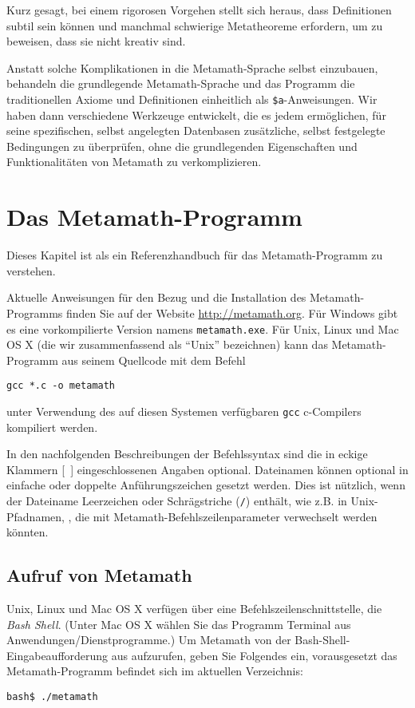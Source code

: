 Kurz gesagt, bei einem rigorosen Vorgehen stellt sich heraus, dass Definitionen subtil sein können und manchmal schwierige Metatheoreme erfordern, um zu beweisen, dass sie nicht kreativ sind.

Anstatt solche Komplikationen in die Metamath-Sprache selbst einzubauen, behandeln die grundlegende Metamath-Sprache und das Programm die traditionellen Axiome und Definitionen einheitlich als \texttt{\$a}-Anweisungen. Wir haben dann verschiedene Werkzeuge entwickelt, die es jedem ermöglichen, für seine spezifischen, selbst angelegten Datenbasen zusätzliche, selbst festgelegte Bedingungen zu überprüfen, ohne die grundlegenden Eigenschaften und Funktionalitäten von Metamath zu verkomplizieren.

\chapter{Das Metamath-Programm}\label{commands}

Dieses Kapitel ist als ein Referenzhandbuch für das Metamath-Programm zu verstehen.

Aktuelle Anweisungen für den Bezug und die Installation des Metamath-Programms finden Sie auf der Website \url{http://metamath.org}. Für Windows gibt es eine vorkompilierte Version namens \texttt{metamath.exe}.  Für Unix, Linux und Mac OS X (die wir zusammenfassend als "`Unix"' bezeichnen) kann das Metamath-Programm aus seinem Quellcode mit dem Befehl
\begin{verbatim}
gcc *.c -o metamath
\end{verbatim}
unter Verwendung des auf diesen Systemen verfügbaren \texttt{gcc} {\sc c}-Compilers kompiliert werden.

In den nachfolgenden Beschreibungen der Befehlssyntax sind die in eckige Klammern [\ ] eingeschlossenen Angaben optional.  Dateinamen können optional in einfache oder doppelte Anführungszeichen gesetzt werden.  Dies ist nützlich, wenn der Dateiname Leerzeichen oder Schrägstriche (\texttt{/}) enthält, wie z.B. in Unix-Pfadnamen, , die mit Metamath-Befehlszeilenparameter verwechselt werden könnten.

\section{Aufruf von Metamath}

Unix, Linux und Mac OS X verfügen über eine Befehlszeilenschnittstelle, die  {\em Bash Shell}.  (Unter Mac OS X wählen Sie das Programm Terminal aus Anwendungen/Dienstprogramme.) Um Metamath von der Bash-Shell-Eingabeaufforderung aus aufzurufen, geben Sie Folgendes ein, vorausgesetzt das Metamath-Programm befindet sich im aktuellen Verzeichnis:
\begin{verbatim}
bash$ ./metamath
\end{verbatim}

